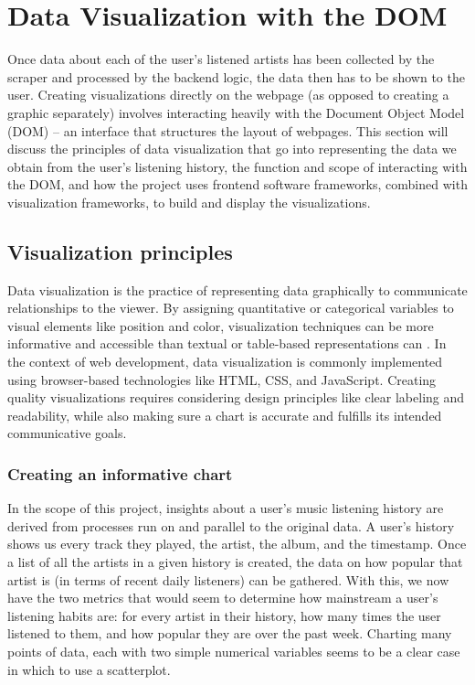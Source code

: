 \chapter{Data Visualization with the DOM}\label{dataviz}

Once data about each of the user's listened artists has been collected by the scraper and processed by the backend logic, the data then has to be shown to the user. Creating visualizations directly on the webpage (as opposed to creating a graphic separately) involves interacting heavily with the Document Object Model (DOM) -- an interface that structures the layout of webpages. This section will discuss the  principles of data visualization that go into representing the data we obtain from the user's listening history, the function and scope of interacting with the DOM, and how the project uses frontend software frameworks, combined with visualization frameworks, to build and display the visualizations.

\section{Visualization principles}

Data visualization is the practice of representing data graphically to communicate relationships to the viewer. By assigning quantitative or categorical variables to visual elements like position and color, visualization techniques can be more informative and accessible than textual or table-based representations can \cite{wilke_fundamentals_2019}. In the context of web development, data visualization is commonly implemented using browser-based technologies like HTML, CSS, and JavaScript. Creating quality visualizations requires considering design principles like clear labeling and readability, while also making sure a chart is accurate and fulfills its intended communicative goals.

\subsection{Creating an informative chart}

In the scope of this project, insights about a user's music listening history are derived from processes run on and parallel to the original data. A user's history shows us every track they played, the artist, the album, and the timestamp. Once a list of all the artists in a given history is created, the data on how popular that artist is (in terms of recent daily listeners) can be gathered. With this, we now have the two metrics that would seem to determine how mainstream a user's listening habits are: for every artist in their history, how many times the user listened to them, and how popular they are over the past week. Charting many points of data, each with two simple numerical variables seems to be a clear case in which to use a scatterplot.

